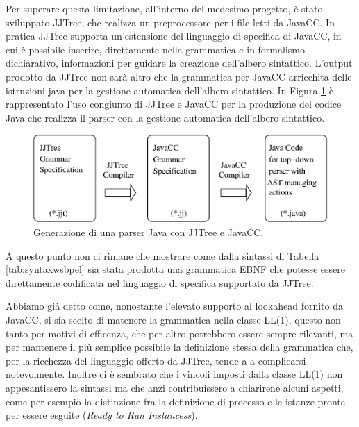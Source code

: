 Per superare questa limitazione, all'interno del medesimo progetto, è stato
sviluppato JJTree, che realizza un preprocessore per i file letti da JavaCC. In
pratica JJTree supporta un'estensione del linguaggio di specifica di JavaCC, in
cui è possibile inserire, direttamente nella grammatica e in formalismo
dichiarativo, informazioni per guidare la creazione dell'albero sintattico.
L'output prodotto da JJTree non sarà altro che la grammatica per JavaCC
arricchita delle istruzioni java per la gestione automatica dell'albero
sintattico. In Figura \ref{fig:lin:jjproc} è rappresentato l'uso
congiunto di JJTree e JavaCC per la produzione del codice Java che realizza il
parser con la gestione automatica dell'albero sintattico.

\begin{figure}[!ht]
\begin{center}
  \includegraphics[scale=0.95]{linguaggio/dia/jjporc}
   \caption[Un parser con JJTree JavaCC]{Generazione di una
   parser Java con JJTree e JavaCC.}
  \label{fig:lin:jjproc}
\end{center}
\end{figure}

A questo punto non ci rimane che mostrare come dalla sintassi di Tabella
\ref{tab:syntaxwsbpel} sia stata prodotta una grammatica EBNF che potesse
essere direttamente codificata nel linguaggio di specifica supportato da
JJTree.

Abbiamo già detto come, nonostante l'elevato supporto al lookahead fornito
da JavaCC, si sia scelto di matenere la grammatica nella classe LL(1), questo
non tanto per motivi di efficenza, che per altro potrebbero essere sempre
rilevanti, ma per mantenere il più semplice possibile la definizione stessa
della grammatica che, per la ricchezza del linguaggio offerto da JJTree, tende a
a complicarsi notevolmente. Inoltre ci è sembrato che i vincoli imposti dalla
classe LL(1) non appesantissero la sintassi ma che anzi contribuissero a chiarirene
alcuni aspetti, come per esempio la distinzione fra la definizione di processo
e le istanze pronte per essere esguite (\emph{Ready to Run Instancess}).

